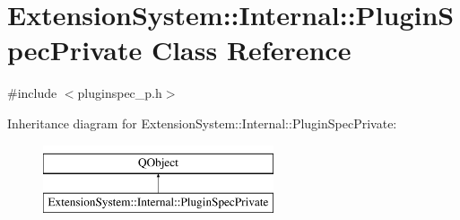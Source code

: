 \hypertarget{class_extension_system_1_1_internal_1_1_plugin_spec_private}{\section{Extension\-System\-:\-:Internal\-:\-:Plugin\-Spec\-Private Class Reference}
\label{class_extension_system_1_1_internal_1_1_plugin_spec_private}
}


{\ttfamily \#include $<$pluginspec\-\_\-p.\-h$>$}

Inheritance diagram for Extension\-System\-:\-:Internal\-:\-:Plugin\-Spec\-Private\-:\begin{figure}[H]
\begin{center}
\leavevmode
\includegraphics[height=2.000000cm]{class_extension_system_1_1_internal_1_1_plugin_spec_private}
\end{center}
\end{figure}
